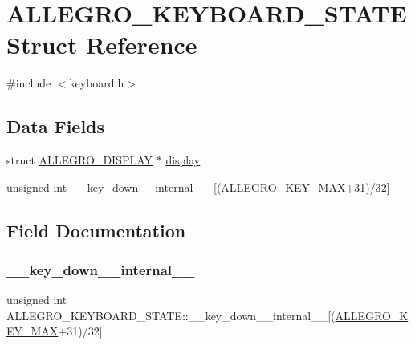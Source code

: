 \hypertarget{struct_a_l_l_e_g_r_o___k_e_y_b_o_a_r_d___s_t_a_t_e}{}\section{A\+L\+L\+E\+G\+R\+O\+\_\+\+K\+E\+Y\+B\+O\+A\+R\+D\+\_\+\+S\+T\+A\+TE Struct Reference}
\label{struct_a_l_l_e_g_r_o___k_e_y_b_o_a_r_d___s_t_a_t_e}


{\ttfamily \#include $<$keyboard.\+h$>$}

\subsection*{Data Fields}
\begin{DoxyCompactItemize}
\item 
struct \hyperlink{display_8h_a7516185aa39c086f4bc62bd4bf5858bf}{A\+L\+L\+E\+G\+R\+O\+\_\+\+D\+I\+S\+P\+L\+AY} $\ast$ \hyperlink{struct_a_l_l_e_g_r_o___k_e_y_b_o_a_r_d___s_t_a_t_e_a3a0de008e166e446aa66daa738ad003d}{display}
\item 
unsigned int \hyperlink{struct_a_l_l_e_g_r_o___k_e_y_b_o_a_r_d___s_t_a_t_e_a5b0c36534c406a63df55429c007d1fd9}{\+\_\+\+\_\+key\+\_\+down\+\_\+\+\_\+internal\+\_\+\+\_\+} \mbox{[}(\hyperlink{keycodes_8h_aaf105ae5beaca1dee30ae54530691fcea04e7e0d0fd0f3fe31610ccc062e187c7}{A\+L\+L\+E\+G\+R\+O\+\_\+\+K\+E\+Y\+\_\+\+M\+AX}+31)/32\mbox{]}
\end{DoxyCompactItemize}


\subsection{Field Documentation}
\mbox{\label{struct_a_l_l_e_g_r_o___k_e_y_b_o_a_r_d___s_t_a_t_e_a5b0c36534c406a63df55429c007d1fd9}} 
\subsubsection{\texorpdfstring{\+\_\+\+\_\+key\+\_\+down\+\_\+\+\_\+internal\+\_\+\+\_\+}{\_\_key\_down\_\_internal\_\_}}
{\footnotesize\ttfamily unsigned int A\+L\+L\+E\+G\+R\+O\+\_\+\+K\+E\+Y\+B\+O\+A\+R\+D\+\_\+\+S\+T\+A\+T\+E\+::\+\_\+\+\_\+key\+\_\+down\+\_\+\+\_\+internal\+\_\+\+\_\+\mbox{[}(\hyperlink{keycodes_8h_aaf105ae5beaca1dee30ae54530691fcea04e7e0d0fd0f3fe31610ccc062e187c7}{A\+L\+L\+E\+G\+R\+O\+\_\+\+K\+E\+Y\+\_\+\+M\+AX}+31)/32\mbox{]}}

